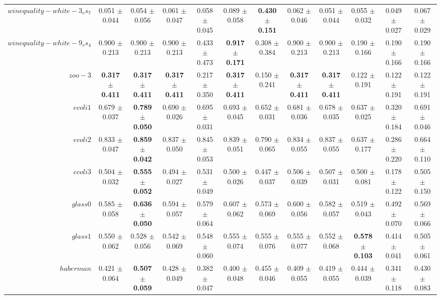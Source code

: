 \begin{table}[!ht]
{\begin{tabular}{r c c c c c c c c c c c}
$winequality-white-3_vs_7$ & 0.051 $\pm$ 0.044 & 0.054 $\pm$ 0.056 & 0.061 $\pm$ 0.047 & 0.058 $\pm$ 0.045 & 0.089 $\pm$ 0.058 & \textbf{0.430 $\pm$ 0.151} & 0.062 $\pm$ 0.046 & 0.051 $\pm$ 0.044 & 0.055 $\pm$ 0.032 & 0.049 $\pm$ 0.027 & 0.067 $\pm$ 0.029 \\
$winequality-white-9_vs_4$ & 0.900 $\pm$ 0.213 & 0.900 $\pm$ 0.213 & 0.900 $\pm$ 0.213 & 0.433 $\pm$ 0.473 & \textbf{0.917 $\pm$ 0.171} & 0.308 $\pm$ 0.384 & 0.900 $\pm$ 0.213 & 0.900 $\pm$ 0.213 & 0.190 $\pm$ 0.166 & 0.190 $\pm$ 0.166 & 0.190 $\pm$ 0.166 \\
$zoo-3$ & \textbf{0.317 $\pm$ 0.411} & \textbf{0.317 $\pm$ 0.411} & \textbf{0.317 $\pm$ 0.411} & 0.217 $\pm$ 0.350 & \textbf{0.317 $\pm$ 0.411} & 0.150 $\pm$ 0.241 & \textbf{0.317 $\pm$ 0.411} & \textbf{0.317 $\pm$ 0.411} & 0.122 $\pm$ 0.191 & 0.122 $\pm$ 0.191 & 0.122 $\pm$ 0.191 \\
$ecoli1$ & 0.679 $\pm$ 0.037 & \textbf{0.789 $\pm$ 0.050} & 0.690 $\pm$ 0.026 & 0.695 $\pm$ 0.031 & 0.693 $\pm$ 0.045 & 0.652 $\pm$ 0.031 & 0.681 $\pm$ 0.036 & 0.678 $\pm$ 0.035 & 0.637 $\pm$ 0.025 & 0.320 $\pm$ 0.184 & 0.691 $\pm$ 0.046 \\
$ecoli2$ & 0.833 $\pm$ 0.047 & \textbf{0.859 $\pm$ 0.042} & 0.837 $\pm$ 0.050 & 0.845 $\pm$ 0.053 & 0.839 $\pm$ 0.051 & 0.790 $\pm$ 0.065 & 0.834 $\pm$ 0.055 & 0.837 $\pm$ 0.055 & 0.637 $\pm$ 0.177 & 0.286 $\pm$ 0.220 & 0.664 $\pm$ 0.110 \\
$ecoli3$ & 0.504 $\pm$ 0.032 & \textbf{0.555 $\pm$ 0.052} & 0.494 $\pm$ 0.027 & 0.531 $\pm$ 0.049 & 0.500 $\pm$ 0.026 & 0.447 $\pm$ 0.037 & 0.506 $\pm$ 0.039 & 0.507 $\pm$ 0.031 & 0.500 $\pm$ 0.081 & 0.178 $\pm$ 0.122 & 0.505 $\pm$ 0.150 \\
$glass0$ & 0.585 $\pm$ 0.058 & \textbf{0.636 $\pm$ 0.050} & 0.594 $\pm$ 0.057 & 0.579 $\pm$ 0.064 & 0.607 $\pm$ 0.062 & 0.573 $\pm$ 0.069 & 0.600 $\pm$ 0.056 & 0.582 $\pm$ 0.057 & 0.519 $\pm$ 0.043 & 0.492 $\pm$ 0.070 & 0.569 $\pm$ 0.066 \\
$glass1$ & 0.550 $\pm$ 0.062 & 0.528 $\pm$ 0.056 & 0.542 $\pm$ 0.069 & 0.548 $\pm$ 0.060 & 0.555 $\pm$ 0.074 & 0.555 $\pm$ 0.076 & 0.555 $\pm$ 0.077 & 0.552 $\pm$ 0.068 & \textbf{0.578 $\pm$ 0.103} & 0.414 $\pm$ 0.041 & 0.505 $\pm$ 0.061 \\
$haberman$ & 0.421 $\pm$ 0.064 & \textbf{0.507 $\pm$ 0.059} & 0.428 $\pm$ 0.049 & 0.382 $\pm$ 0.047 & 0.400 $\pm$ 0.048 & 0.455 $\pm$ 0.046 & 0.409 $\pm$ 0.055 & 0.419 $\pm$ 0.055 & 0.444 $\pm$ 0.039 & 0.341 $\pm$ 0.118 & 0.430 $\pm$ 0.083 \\

\end{tabular}}
\end{table}

